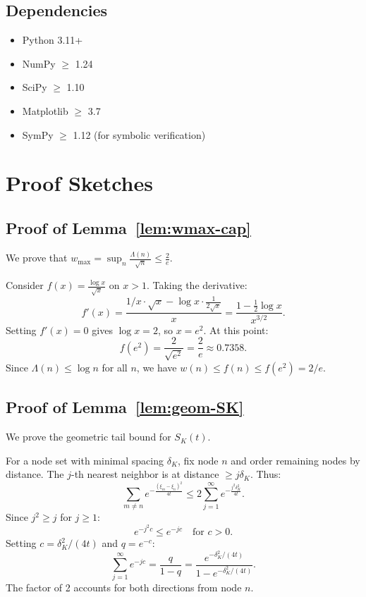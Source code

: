 \subsection{Dependencies}

\begin{itemize}
  \item Python 3.11+
  \item NumPy $\geq$ 1.24
  \item SciPy $\geq$ 1.10
  \item Matplotlib $\geq$ 3.7
  \item SymPy $\geq$ 1.12 (for symbolic verification)
\end{itemize}

\section{Proof Sketches}\label{app:proofs}

\subsection{Proof of Lemma~\ref{lem:wmax-cap}}

We prove that $w_{\max} = \sup_n \frac{\Lambda(n)}{\sqrt{n}} \leq \frac{2}{e}$.

Consider $f(x) = \frac{\log x}{\sqrt{x}}$ on $x > 1$. Taking the derivative:
\begin{equation}
  f'(x) = \frac{1/x \cdot \sqrt{x} - \log x \cdot \frac{1}{2\sqrt{x}}}{x} = \frac{1 - \frac{1}{2}\log x}{x^{3/2}}.
\end{equation}
Setting $f'(x) = 0$ gives $\log x = 2$, so $x = e^2$. At this point:
\begin{equation}
  f(e^2) = \frac{2}{\sqrt{e^2}} = \frac{2}{e} \approx 0.7358.
\end{equation}
Since $\Lambda(n) \leq \log n$ for all $n$, we have $w(n) \leq f(n) \leq f(e^2) = 2/e$.

\subsection{Proof of Lemma~\ref{lem:geom-SK}}

We prove the geometric tail bound for $S_K(t)$.

For a node set with minimal spacing $\delta_K$, fix node $n$ and order remaining nodes by distance. The $j$-th nearest neighbor is at distance $\geq j \delta_K$. Thus:
\begin{equation}
  \sum_{m \neq n} e^{-\frac{(\xi_m - \xi_n)^2}{4t}} \leq 2 \sum_{j=1}^\infty e^{-\frac{j^2 \delta_K^2}{4t}}.
\end{equation}
Since $j^2 \geq j$ for $j \geq 1$:
\begin{equation}
  e^{-j^2 c} \leq e^{-jc} \quad \text{for } c > 0.
\end{equation}
Setting $c = \delta_K^2/(4t)$ and $q = e^{-c}$:
\begin{equation}
  \sum_{j=1}^\infty e^{-jc} = \frac{q}{1-q} = \frac{e^{-\delta_K^2/(4t)}}{1 - e^{-\delta_K^2/(4t)}}.
\end{equation}
The factor of 2 accounts for both directions from node $n$.

